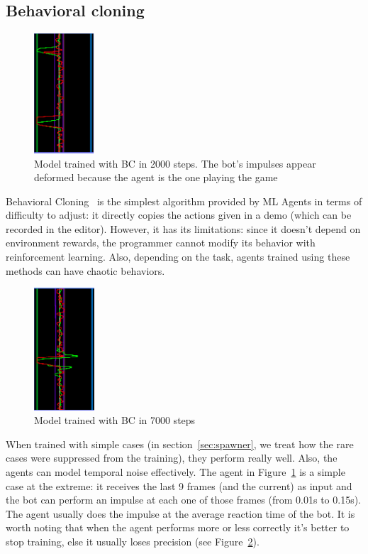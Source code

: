 \subsection{Behavioral cloning}
\label{sec:timeBC}

\begin{figure}
    \centering
    \includegraphics[width=0.2\textwidth]{img/bcTNoise.png}
		\caption{Model trained with BC in 2000 steps. The bot's impulses appear deformed because the agent is the one playing the game}
		\label{fig:bcTNoise}
\end{figure}


Behavioral Cloning~\cite{Sammut2010} is the simplest algorithm provided by ML Agents in terms of difficulty to adjust: it directly copies the actions given in a demo (which can be recorded in the editor). However, it has its limitations: since it doesn't depend on environment rewards, the programmer cannot modify its behavior with reinforcement learning. Also, depending on the task, agents trained using these methods can have chaotic behaviors.

\begin{figure}
    \centering
    \includegraphics[width=0.2\textwidth]{img/bcTNovertrain.png}
		\caption{Model trained with BC in 7000 steps}
		\label{fig:bcTNovertrain}
\end{figure}

When trained with simple cases (in section~\ref{sec:spawner}, we treat how the rare cases were suppressed from the training), they perform really well. Also, the agents can model temporal noise effectively. The agent in Figure~\ref{fig:bcTNoise} is a simple case at the extreme: it receives the last 9 frames (and the current) as input and the bot can perform an impulse at each one of those frames (from 0.01s to 0.15s). The agent usually does the impulse at the average reaction time of the bot. It is worth noting that when the agent performs more or less correctly it's better to stop training, else it usually loses precision (see Figure~\ref{fig:bcTNovertrain}).

